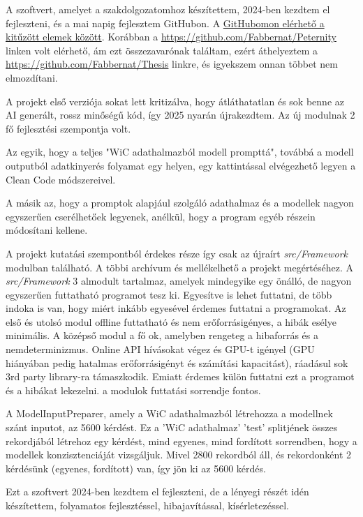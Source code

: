 \documentclass[12pt]{report}
\theoremstyle{definition}
\begin{document}
A szoftvert, amelyet a szakdolgozatomhoz készítettem, 2024-ben kezdtem el fejleszteni, és a mai napig fejlesztem GitHubon. A \href{https://github.com/Fabbernat}{GitHubomon elérhető a kitűzött elemek között}. Korábban a \href{https://github.com/Fabbernat/Peternity}{https://github.com/Fabbernat/Peternity} linken volt elérhető, ám ezt összezavarónak találtam, ezért áthelyeztem a \href{https://github.com/Fabbernat/Thesis} {https://github.com/Fabbernat/Thesis} linkre, és igyekszem onnan többet nem elmozdítani.

A projekt első verziója sokat lett kritizálva, hogy átláthatatlan és sok benne az AI generált, rossz minőségű kód, így 2025 nyarán újrakezdtem. Az új modulnak 2 fő fejlesztési szempontja volt.

Az egyik, hogy a teljes "WiC adathalmazból modell prompttá", továbbá a modell outputból adatkinyerés %
folyamat egy helyen, egy kattintással elvégezhető legyen a Clean Code módszereivel.

A másik az, hogy a promptok alapjául szolgáló adathalmaz és a modellek nagyon egyszerűen cserélhetőek legyenek, anélkül, hogy a program egyéb részein módosítani kellene.


A projekt kutatási szempontból érdekes része így csak az újraírt \textit{src/Framework} modulban található. A többi archívum és mellékelhető a projekt megértéséhez. A \textit{src/Framework} 3 almodult tartalmaz, amelyek mindegyike egy önálló, de nagyon egyszerűen futtatható programot tesz ki. Egyesítve is lehet futtatni, de több indoka is van, hogy miért inkább egyesével érdemes futtatni a programokat. Az első és utolsó modul offline futtatható és nem erőforrásigényes, a hibák esélye minimális. A középső modul a fő ok, amelyben rengeteg a hibaforrás és a nemdeterminizmus. Online API hívásokat végez és GPU-t igényel (GPU hiányában pedig hatalmas erőforrásigényt és számítási kapacitást), ráadásul sok 3rd party library-ra támaszkodik. Emiatt érdemes külön futtatni ezt a programot és a hibákat lekezelni. a modulok futtatási sorrendje fontos.

A ModelInputPreparer, amely a WiC adathalmazból létrehozza a modellnek szánt inputot, az 5600 kérdést. Ez a 'WiC adathalmaz' 'test' splitjének összes rekordjából létrehoz egy kérdést, mind egyenes, mind fordított sorrendben, hogy a modellek konzisztenciáját vizsgáljuk. Mivel 2800 rekordból áll, és rekordonként 2 kérdésünk (egyenes, fordított) van, így jön ki az 5600 kérdés.


Ezt a szoftvert 2024-ben kezdtem el fejleszteni, de a lényegi részét idén készítettem, folyamatos fejlesztéssel, hibajavítással, kísérletezéssel.
\end{document}
